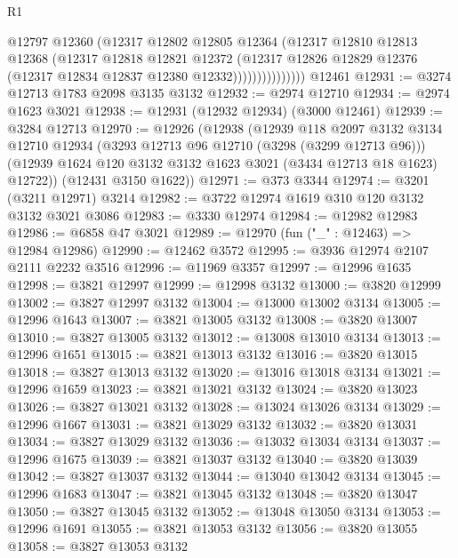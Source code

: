 \begin{lexlean}{R1}
\begin{coremodule}
                        @12797
                        @12360
                        (@12317
                          @12802
                          @12805
                          @12364
                          (@12317
                            @12810
                            @12813
                            @12368
                            (@12317
                              @12818
                              @12821
                              @12372
                              (@12317
                                @12826
                                @12829
                                @12376
                                (@12317 @12834 @12837 @12380 @12332)))))))))))))))
    @12461
@12931 := @3274 @12713 @1783 @2098 @3135 @3132
@12932 := @2974 @12710
@12934 := @2974 @1623 @3021
@12938 := @12931 (@12932 @12934) (@3000 @12461)
@12939 := @3284 @12713
@12970 := @12926
    (@12938
      (@12939
        @118
        @2097
        @3132
        @3134
        @12710
        @12934
        (@3293 @12713 @96 @12710 (@3298 (@3299 @12713 @96)))
        (@12939 @1624 @120 @3132 @3132 @1623 @3021 (@3434 @12713 @18 @1623) @12722))
      (@12431 @3150 @1622))
@12971 := @373 @3344
@12974 := @3201 (@3211 @12971) @3214
@12982 := @3722 @12974 @1619 @310 @120 @3132 @3132 @3021 @3086
@12983 := @3330 @12974
@12984 := @12982 @12983
@12986 := @6858 @47 @3021
@12989 := @12970 (fun ("_" : @12463) => @12984 @12986)
@12990 := @12462 @3572
@12995 := @3936 @12974 @2107 @2111 @2232 @3516
@12996 := @11969 @3357
@12997 := @12996 @1635
@12998 := @3821 @12997
@12999 := @12998 @3132
@13000 := @3820 @12999
@13002 := @3827 @12997 @3132
@13004 := @13000 @13002 @3134
@13005 := @12996 @1643
@13007 := @3821 @13005 @3132
@13008 := @3820 @13007
@13010 := @3827 @13005 @3132
@13012 := @13008 @13010 @3134
@13013 := @12996 @1651
@13015 := @3821 @13013 @3132
@13016 := @3820 @13015
@13018 := @3827 @13013 @3132
@13020 := @13016 @13018 @3134
@13021 := @12996 @1659
@13023 := @3821 @13021 @3132
@13024 := @3820 @13023
@13026 := @3827 @13021 @3132
@13028 := @13024 @13026 @3134
@13029 := @12996 @1667
@13031 := @3821 @13029 @3132
@13032 := @3820 @13031
@13034 := @3827 @13029 @3132
@13036 := @13032 @13034 @3134
@13037 := @12996 @1675
@13039 := @3821 @13037 @3132
@13040 := @3820 @13039
@13042 := @3827 @13037 @3132
@13044 := @13040 @13042 @3134
@13045 := @12996 @1683
@13047 := @3821 @13045 @3132
@13048 := @3820 @13047
@13050 := @3827 @13045 @3132
@13052 := @13048 @13050 @3134
@13053 := @12996 @1691
@13055 := @3821 @13053 @3132
@13056 := @3820 @13055
@13058 := @3827 @13053 @3132

\end{coremodule}
\end{lexlean}
